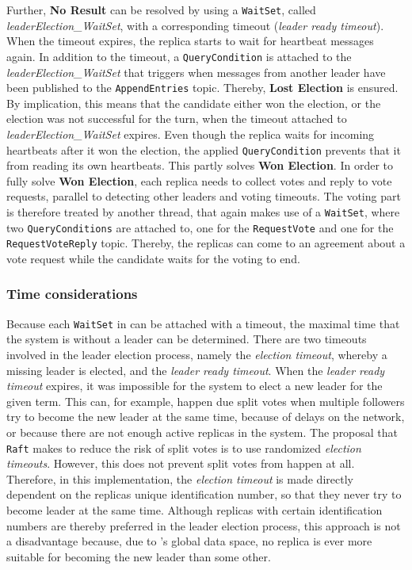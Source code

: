 Further, \textbf{No Result} can be resolved by using a \texttt{WaitSet}, called \textit{leaderElection\_WaitSet}, with a corresponding timeout (\textit{leader ready timeout}).
When the timeout expires, the replica starts to wait for heartbeat messages again.
In addition to the timeout, a \texttt{QueryCondition} is attached to the \textit{leaderElection\_WaitSet} that triggers when messages from another leader have been published to the \texttt{AppendEntries} topic.
Thereby, \textbf{Lost Election} is ensured.
By implication, this means that the candidate either won the election, or the election was not successful for the turn, when the timeout attached to \textit{leaderElection\_WaitSet} expires.
Even though the replica waits for incoming heartbeats after it won the election, the applied \texttt{QueryCondition} prevents that it from reading its own heartbeats.
This partly solves \textbf{Won Election}.
In order to fully solve \textbf{Won Election}, each replica needs to collect votes and reply to vote requests, parallel to detecting other leaders and voting timeouts.
The voting part is therefore treated by another  thread, that again makes use of a \texttt{WaitSet}, where two \texttt{QueryConditions} are attached to, one for the \texttt{RequestVote} and one for the \texttt{RequestVoteReply} topic.
Thereby, the replicas can come to an agreement about a vote request while the candidate waits for the voting to end.

\subsubsection{Time considerations}
\label{subsub:timeConsiderations}
Because each \texttt{WaitSet} in  can be attached with a timeout, the maximal time that the system is without a leader can be determined.
There are two timeouts involved in the leader election process, namely the \textit{election timeout}, whereby a missing leader is elected, and the \textit{leader ready timeout}.
When the \textit{leader ready timeout} expires, it was impossible for the system to elect a new leader for the given term.
This can, for example, happen due split votes when multiple followers try to become the new leader at the same time, because of delays on the network, or because there are not enough active replicas in the system.
The proposal that \texttt{Raft} makes to reduce the risk of split votes is to use randomized \textit{election timeouts}.
However, this does not prevent split votes from happen at all.
Therefore, in this implementation, the \textit{election timeout} is made directly dependent on the replicas unique identification number, so that they never try to become leader at the same time.
Although replicas with certain identification numbers are thereby preferred in the leader election process, this approach is not a disadvantage because, due to 's global data space, no replica is ever more suitable for becoming the new leader than some other.

